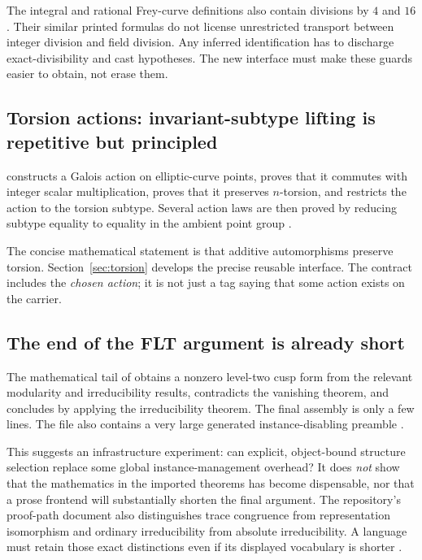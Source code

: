 \documentclass[11pt,a4paper]{article}
\theoremstyle{plain}
\theoremstyle{definition}
\begin{document}
The integral and rational Frey-curve definitions also contain divisions by $4$ and $16$. Their similar printed formulas do not license unrestricted transport between integer division and field division. Any inferred identification has to discharge exact-divisibility and cast hypotheses. The new interface must make these guards easier to obtain, not erase them.

\subsection{Torsion actions: invariant-subtype lifting is repetitive but principled}
 constructs a Galois action on elliptic-curve points, proves that it commutes with integer scalar multiplication, proves that it preserves $n$-torsion, and restricts the action to the torsion subtype. Several action laws are then proved by reducing subtype equality to equality in the ambient point group \cite{galois}.

The concise mathematical statement is that additive automorphisms preserve torsion. Section~\ref{sec:torsion} develops the precise reusable interface. The contract includes the \emph{chosen action}; it is not just a tag saying that some action exists on the carrier.

\subsection{The end of the FLT argument is already short}
The mathematical tail of  obtains a nonzero level-two cusp form from the relevant modularity and irreducibility results, contradicts the vanishing theorem, and concludes by applying the irreducibility theorem. The final assembly is only a few lines. The file also contains a very large generated instance-disabling preamble \cite{freytail}.

This suggests an infrastructure experiment: can explicit, object-bound structure selection replace some global instance-management overhead? It does \emph{not} show that the mathematics in the imported theorems has become dispensable, nor that a prose frontend will substantially shorten the final argument. The repository's proof-path document also distinguishes trace congruence from representation isomorphism and ordinary irreducibility from absolute irreducibility. A language must retain those exact distinctions even if its displayed vocabulary is shorter \cite{proofpath}.
\end{document}

